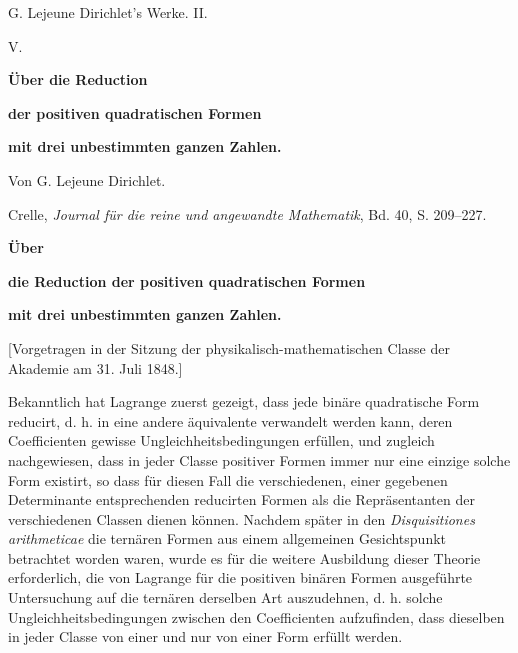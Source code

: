 \documentclass[11pt]{article}
\begin{document}
\begin{center}
{\Large G. Lejeune Dirichlet's Werke. II.}\par\vspace{1.2em}
{\Large V.}\par\vspace{0.5em}
{\LARGE \textbf{Über die Reduction}}\par
{\LARGE \textbf{der positiven quadratischen Formen}}\par
{\LARGE \textbf{mit drei unbestimmten ganzen Zahlen.}}\par\vspace{1em}
{\large Von G. Lejeune Dirichlet.}\par\vspace{0.5em}
{\small Crelle, \emph{Journal für die reine und angewandte Mathematik}, Bd. 40, S. 209--227.}
\end{center}

\begin{center}
\textbf{Über}\par
\textbf{die Reduction der positiven quadratischen Formen}\par
\textbf{mit drei unbestimmten ganzen Zahlen.}\par
{\small [Vorgetragen in der Sitzung der physikalisch-mathematischen Classe der Akademie am 31. Juli 1848\footnotemark.]}
\end{center}

Bekanntlich hat Lagrange zuerst gezeigt, dass jede binäre quadratische Form reducirt, d. h. in eine andere äquivalente verwandelt werden kann, deren Coefficienten gewisse Ungleichheitsbedingungen erfüllen, und zugleich nachgewiesen, dass in jeder Classe positiver Formen immer nur eine einzige solche Form existirt, so dass für diesen Fall die verschiedenen, einer gegebenen Determinante entsprechenden reducirten Formen als die Repräsentanten der verschiedenen Classen dienen können. Nachdem später in den \emph{Disquisitiones arithmeticae} die ternären Formen aus einem allgemeinen Gesichtspunkt betrachtet worden waren, wurde es für die weitere Ausbildung dieser Theorie erforderlich, die von Lagrange für die positiven binären Formen ausgeführte Untersuchung auf die ternären derselben Art auszudehnen, d. h. solche Ungleichheitsbedingungen zwischen den Coefficienten aufzufinden, dass dieselben in jeder Classe von einer und nur von einer Form erfüllt werden.
\end{document}
